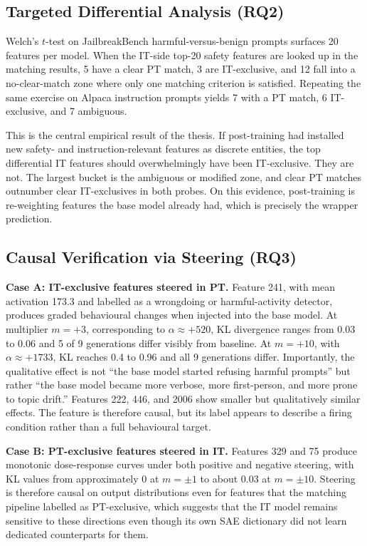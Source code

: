 \subsection{Targeted Differential Analysis (RQ2)}
\label{subsec:rq2-results}

Welch's $t$-test on JailbreakBench harmful-versus-benign prompts surfaces 20 features per model. When the IT-side top-20 safety features are looked up in the matching results, 5 have a clear PT match, 3 are IT-exclusive, and 12 fall into a no-clear-match zone where only one matching criterion is satisfied. Repeating the same exercise on Alpaca instruction prompts yields 7 with a PT match, 6 IT-exclusive, and 7 ambiguous.

This is the central empirical result of the thesis. If post-training had installed new safety- and instruction-relevant features as discrete entities, the top differential IT features should overwhelmingly have been IT-exclusive. They are not. The largest bucket is the ambiguous or modified zone, and clear PT matches outnumber clear IT-exclusives in both probes. On this evidence, post-training is re-weighting features the base model already had, which is precisely the wrapper prediction.

\subsection{Causal Verification via Steering (RQ3)}
\label{subsec:rq3-results}

\textbf{Case A: IT-exclusive features steered in PT.} Feature 241, with mean activation 173.3 and labelled as a wrongdoing or harmful-activity detector, produces graded behavioural changes when injected into the base model. At multiplier $m = +3$, corresponding to $\alpha \approx +520$, KL divergence ranges from 0.03 to 0.06 and 5 of 9 generations differ visibly from baseline. At $m = +10$, with $\alpha \approx +1733$, KL reaches 0.4 to 0.96 and all 9 generations differ. Importantly, the qualitative effect is not ``the base model started refusing harmful prompts'' but rather ``the base model became more verbose, more first-person, and more prone to topic drift.'' Features 222, 446, and 2006 show smaller but qualitatively similar effects. The feature is therefore causal, but its label appears to describe a firing condition rather than a full behavioural target.

\textbf{Case B: PT-exclusive features steered in IT.} Features 329 and 75 produce monotonic dose-response curves under both positive and negative steering, with KL values from approximately 0 at $m = \pm 1$ to about 0.03 at $m = \pm 10$. Steering is therefore causal on output distributions even for features that the matching pipeline labelled as PT-exclusive, which suggests that the IT model remains sensitive to these directions even though its own SAE dictionary did not learn dedicated counterparts for them.

